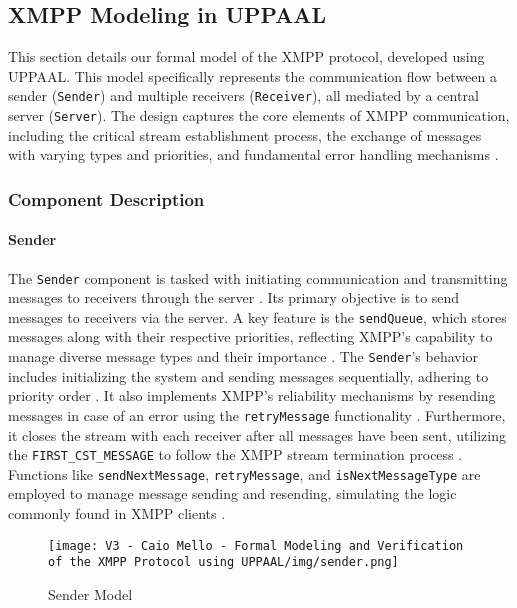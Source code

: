\subsection{XMPP Modeling in UPPAAL}

This section details our formal model of the XMPP protocol, developed using UPPAAL. This model specifically represents the communication flow between a sender (\texttt{Sender}) and multiple receivers (\texttt{Receiver}), all mediated by a central server (\texttt{Server}). The design captures the core elements of XMPP communication, including the critical stream establishment process, the exchange of messages with varying types and priorities, and fundamental error handling mechanisms \cite{meijer2005jabber,rfc6120}.

\subsubsection{Component Description}

\paragraph{Sender}
The \texttt{Sender} component is tasked with initiating communication and transmitting messages to receivers through the server \cite{meijer2005jabber}. Its primary objective is to send messages to receivers via the server. A key feature is the \texttt{sendQueue}, which stores messages along with their respective priorities, reflecting XMPP's capability to manage diverse message types and their importance \cite{smith2009xmpp}. The \texttt{Sender}'s behavior includes initializing the system and sending messages sequentially, adhering to priority order \cite{waher2015learning}. It also implements XMPP's reliability mechanisms by resending messages in case of an error using the \texttt{retryMessage} functionality \cite{rfc6120}. Furthermore, it closes the stream with each receiver after all messages have been sent, utilizing the \texttt{FIRST\_CST\_MESSAGE} to follow the XMPP stream termination process \cite{meijer2005jabber}. Functions like \texttt{sendNextMessage}, \texttt{retryMessage}, and \texttt{isNextMessageType} are employed to manage message sending and resending, simulating the logic commonly found in XMPP clients \cite{adams2002xep}.

\begin{figure}[h]
\centering
\texttt{[image: V3 - Caio Mello - Formal Modeling and Verification of the XMPP Protocol using UPPAAL/img/sender.png]}
\caption{Sender Model}
\label{fig:sender}
\end{figure}

